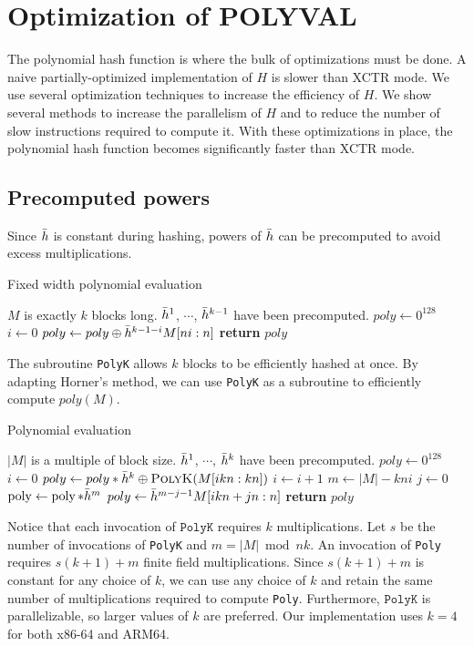 \documentclass[hctr2.tex]{subfiles}
\begin{document}
\section{Optimization of POLYVAL}\label{polyvalimpl}
The polynomial hash function is where the bulk of optimizations must be done. A naive partially-optimized implementation of $H$ is slower than XCTR mode. We use several optimization techniques to increase the efficiency of $H$. We show several methods to increase the parallelism of $H$ and to reduce the number of slow instructions required to compute it. With these optimizations in place, the polynomial hash function becomes significantly faster than XCTR mode.

\subsection{Precomputed powers}
Since $\bar{h}$ is constant during hashing, powers of $\bar{h}$ can be precomputed to avoid excess multiplications. 
\begin{algorithm}[H]
\caption{Fixed width polynomial evaluation}\label{polykalg}
\begin{algorithmic}[1]
	\Require $M$ is exactly $k$ blocks long.
	\Require $\bar{h}^1$, $\cdots$, $\bar{h}^{k-1}$ have been precomputed.
		\State $poly \gets 0^{128}$
		\State $i \gets 0$
		\State $poly \gets poly \oplus \bar{h}^{k-1-i}M[ni:n]$
		\EndFor
		\State \textbf{return} $poly$
	\EndProcedure
\end{algorithmic}
\end{algorithm}
The subroutine \texttt{PolyK} allows $k$ blocks to be efficiently hashed at once. By adapting Horner's method, we can use \texttt{PolyK} as a subroutine to efficiently compute $poly(M)$.

\begin{algorithm}[H]
\caption{Polynomial evaluation}\label{polyalg}
\begin{algorithmic}[1]
	\Require $|M|$ is a multiple of block size.
	\Require $\bar{h}^1$, $\cdots$, $\bar{h}^{k}$ have been precomputed.
		\State $poly \gets 0^{128}$
		\State $i \gets 0$
			\State $poly \gets poly*\hgen^k \oplus \Call{PolyK}{M[ikn : kn]}$
			\State $i \gets i + 1$
		\EndWhile
		\State $m \gets |M| - kni$
		\State $j \gets 0$
		\State $\operatorname{poly} \gets \operatorname{poly}*\bar{h}^m$
		\State $poly \gets \bar{h}^{m-j-1}M[ikn + jn : n]$
		\EndWhile
		\State \textbf{return} $poly$
	\EndProcedure
\end{algorithmic}
\end{algorithm}
Notice that each invocation of $\texttt{PolyK}$ requires $k$ multiplications. Let $s$ be the number of invocations of \texttt{PolyK} and $m = |M| \bmod nk$. An invocation of \texttt{Poly} requires $s(k+1) + m$ finite field multiplications. Since $s(k+1) + m$ is constant for any choice of $k$, we can use any choice of $k$ and retain the same number of multiplications required to compute \texttt{Poly}. Furthermore, $\texttt{PolyK}$ is parallelizable, so larger values of $k$ are preferred. Our implementation uses $k = 4$ for both x86-64 and ARM64.
\end{document}
